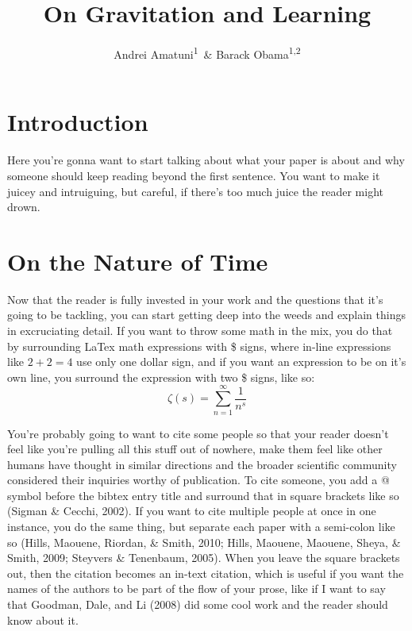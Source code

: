 \documentclass[man,floatsintext]{apa6}
\title{On Gravitation and Learning}
\author{Andrei Amatuni\textsuperscript{1}~\& Barack Obama\textsuperscript{1,2}}
\date{}
\affiliation{
\vspace{0.5cm}
\textsuperscript{1} Indiana University\\\textsuperscript{2} University of Chicago}
\begin{document}
\maketitle

\hypertarget{introduction}{%
\section{Introduction}\label{introduction}}

Here you're gonna want to start talking about what your paper is about and why someone should keep reading beyond the first sentence. You want to make it juicey and intruiguing, but careful, if there's too much juice the reader might drown.

\hypertarget{on-the-nature-of-time}{%
\section{On the Nature of Time}\label{on-the-nature-of-time}}

Now that the reader is fully invested in your work and the questions that it's going to be tackling, you can start getting deep into the weeds and explain things in excruciating detail. If you want to throw some math in the mix, you do that by surrounding LaTex math expressions with \$ signs, where in-line expressions like \(2 + 2 = 4\) use only one dollar sign, and if you want an expression to be on it's own line, you surround the expression with two \$ signs, like so: \[\zeta(s) = \sum_{n=1}^{\infty} \frac{1}{n^s}\]

You're probably going to want to cite some people so that your reader doesn't feel like you're pulling all this stuff out of nowhere, make them feel like other humans have thought in similar directions and the broader scientific community considered their inquiries worthy of publication. To cite someone, you add a @ symbol before the bibtex entry title and surround that in square brackets like so (Sigman \& Cecchi, 2002). If you want to cite multiple people at once in one instance, you do the same thing, but separate each paper with a semi-colon like so (Hills, Maouene, Riordan, \& Smith, 2010; Hills, Maouene, Maouene, Sheya, \& Smith, 2009; Steyvers \& Tenenbaum, 2005). When you leave the square brackets out, then the citation becomes an in-text citation, which is useful if you want the names of the authors to be part of the flow of your prose, like if I want to say that Goodman, Dale, and Li (2008) did some cool work and the reader should know about it.
\end{document}
